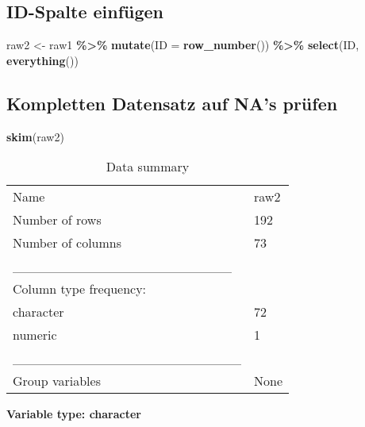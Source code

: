 \documentclass[
]{article}
\newenvironment{Shaded}{\begin{snugshade}}{\end{snugshade}}
\newcommand{\AttributeTok}[1]{\textcolor[rgb]{0.13,0.29,0.53}{#1}}
\newcommand{\FunctionTok}[1]{\textcolor[rgb]{0.13,0.29,0.53}{\textbf{#1}}}
\newcommand{\NormalTok}[1]{#1}
\newcommand{\OtherTok}[1]{\textcolor[rgb]{0.56,0.35,0.01}{#1}}
\newcommand{\SpecialCharTok}[1]{\textcolor[rgb]{0.81,0.36,0.00}{\textbf{#1}}}
\begin{document}
\subsection{ID-Spalte einfügen}\label{id-spalte-einfuxfcgen}

\begin{Shaded}
\begin{Highlighting}[]
\NormalTok{raw2 }\OtherTok{\textless{}{-}}\NormalTok{ raw1 }\SpecialCharTok{\%\textgreater{}\%} 
  \FunctionTok{mutate}\NormalTok{(}\AttributeTok{ID =} \FunctionTok{row\_number}\NormalTok{()) }\SpecialCharTok{\%\textgreater{}\%} 
  \FunctionTok{select}\NormalTok{(ID, }\FunctionTok{everything}\NormalTok{())}
\end{Highlighting}
\end{Shaded}

\subsection{Kompletten Datensatz auf NA's
prüfen}\label{kompletten-datensatz-auf-nas-pruxfcfen}

\begin{Shaded}
\begin{Highlighting}[]
\FunctionTok{skim}\NormalTok{(raw2)}
\end{Highlighting}
\end{Shaded}

\begin{longtable}[]{@{}ll@{}}
\caption{Data summary}\tabularnewline
\toprule\noalign{}
\endfirsthead
\endhead
\bottomrule\noalign{}
\endlastfoot
Name & raw2 \\
Number of rows & 192 \\
Number of columns & 73 \\
\_\_\_\_\_\_\_\_\_\_\_\_\_\_\_\_\_\_\_\_\_\_\_ & \\
Column type frequency: & \\
character & 72 \\
numeric & 1 \\
\_\_\_\_\_\_\_\_\_\_\_\_\_\_\_\_\_\_\_\_\_\_\_\_ & \\
Group variables & None \\
\end{longtable}

\textbf{Variable type: character}
\end{document}
